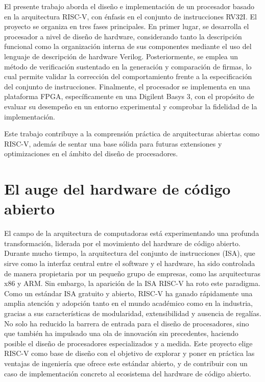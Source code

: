 
\minitoc

\begin{sinopsis}
\label{sec:intro:sinop}

El presente trabajo aborda el diseño e implementación de un procesador basado en la arquitectura RISC-V, con énfasis en el conjunto de instrucciones RV32I. El proyecto se organiza en tres fases principales. En primer lugar, se desarrolla el procesador a nivel de diseño de hardware, considerando tanto la descripción funcional como la organización interna de sus componentes mediante el uso del lenguaje de descripción de hardware Verilog. Posteriormente, se emplea un método de verificación sustentado en la generación y comparación de firmas, lo cual permite validar la corrección del comportamiento frente a la especificación del conjunto de instrucciones. Finalmente, el procesador se implementa en una plataforma FPGA, específicamente en una Digilent Basys 3, con el propósito de evaluar su desempeño en un entorno experimental y comprobar la fidelidad de la implementación.

Este trabajo contribuye a la comprensión práctica de arquitecturas abiertas como RISC-V, además de sentar una base sólida para futuras extensiones y optimizaciones en el ámbito del diseño de procesadores.

\end{sinopsis}

\section{El auge del hardware de código abierto}

El campo de la arquitectura de computadoras está experimentando una profunda transformación, liderada por el movimiento del hardware de código abierto. Durante mucho tiempo, la arquitectura del conjunto de instrucciones (ISA), que sirve como la interfaz central entre el software y el hardware, ha sido controlada de manera propietaria por un pequeño grupo de empresas, como las arquitecturas x86 y ARM. Sin embargo, la aparición de la ISA RISC-V ha roto este paradigma. Como un estándar ISA gratuito y abierto, RISC-V ha ganado rápidamente una amplia atención y adopción tanto en el mundo académico como en la industria, gracias a sus características de modularidad, extensibilidad y ausencia de regalías. No solo ha reducido la barrera de entrada para el diseño de procesadores, sino que también ha impulsado una ola de innovación sin precedentes, haciendo posible el diseño de procesadores especializados y a medida. Este proyecto elige RISC-V como base de diseño con el objetivo de explorar y poner en práctica las ventajas de ingeniería que ofrece este estándar abierto, y de contribuir con un caso de implementación concreto al ecosistema del hardware de código abierto.\cite{wiki:riscv,Free_isa}


